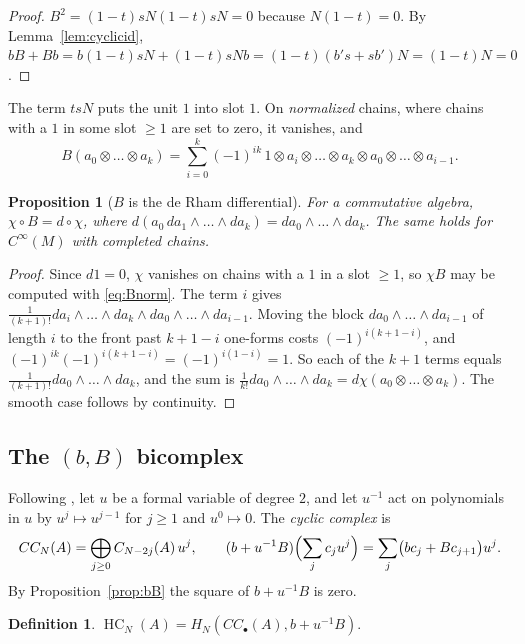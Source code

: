 \documentclass[11pt,oneside,reqno]{article}
\DeclareMathOperator{\HC}{HC}
\newcommand{\CI}{C^\infty}
\theoremstyle{plain}
\newtheorem{proposition}[theorem]{Proposition}
\theoremstyle{definition}
\newtheorem{definition}[theorem]{Definition}
\theoremstyle{remark}
\begin{document}
\begin{proof}
\(B^2=(1-t)sN(1-t)sN=0\) because \(N(1-t)=0\). By Lemma~\ref{lem:cyclicid},
\(bB+Bb=b(1-t)sN+(1-t)sNb=(1-t)(b's+sb')N=(1-t)N=0\).
\end{proof}

The term \(tsN\) puts the unit \(1\) into slot \(1\). On \emph{normalized}
chains, where chains with a \(1\) in some slot \(\ge1\) are set to zero, it
vanishes, and
\begin{equation}\label{eq:Bnorm}
 B(a_0\otimes\dots\otimes a_k)=\sum_{i=0}^k(-1)^{ik}\,1\otimes a_i\otimes\dots
 \otimes a_k\otimes a_0\otimes\dots\otimes a_{i-1}.
\end{equation}

\begin{proposition}[\(B\) is the de Rham differential]\label{prop:Bd}
For a commutative algebra, \(\chi\circ B=d\circ\chi\), where
\(d(a_0\,da_1\wedge\dots\wedge da_k)=da_0\wedge\dots\wedge da_k\). The same
holds for \(\CI(M)\) with completed chains.
\end{proposition}

\begin{proof}
Since \(d1=0\), \(\chi\) vanishes on chains with a \(1\) in a slot \(\ge1\),
so \(\chi B\) may be computed with \eqref{eq:Bnorm}. The term \(i\) gives
\(\frac1{(k+1)!}da_i\wedge\dots\wedge da_k\wedge da_0\wedge\dots\wedge da_{i-1}\).
Moving the block \(da_0\wedge\dots\wedge da_{i-1}\) of length \(i\) to the front
past \(k+1-i\) one-forms costs \((-1)^{i(k+1-i)}\), and
\((-1)^{ik}(-1)^{i(k+1-i)}=(-1)^{i(1-i)}=1\). So each of the \(k+1\) terms equals
\(\frac1{(k+1)!}da_0\wedge\dots\wedge da_k\), and the sum is
\(\frac1{k!}da_0\wedge\dots\wedge da_k=d\chi(a_0\otimes\dots\otimes a_k)\). The
smooth case follows by continuity.
\end{proof}

\subsection{The \texorpdfstring{\((b,B)\)}{(b,B)} bicomplex}\label{subsec:bB}
Following \cite[\S3]{BG}, let \(u\) be a formal variable of degree \(2\), and
let \(u^{-1}\) act on polynomials in \(u\) by \(u^j\mapsto u^{j-1}\) for \(j\ge1\)
and \(u^0\mapsto0\). The \emph{cyclic complex} is
\[
 CC_N(A)=\bigoplus_{j\ge0}C_{N-2j}(A)\,u^j,\qquad
 (b+u^{-1}B)\Bigl(\sum_jc_ju^j\Bigr)=\sum_j\bigl(bc_j+Bc_{j+1}\bigr)u^j .
\]
By Proposition~\ref{prop:bB} the square of \(b+u^{-1}B\) is zero.

\begin{definition}
\(\HC_N(A)=H_N(CC_\bullet(A),b+u^{-1}B)\).
\end{definition}
\end{document}
